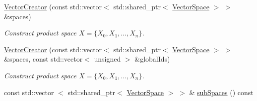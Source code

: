 \begin{DoxyCompactItemize}
\item 
\hyperlink{classSpacy_1_1ProductSpace_1_1VectorCreator_a73b6243d0ba00d019319e66bb06784dd}{\-Vector\-Creator} (const std\-::vector$<$ std\-::shared\-\_\-ptr$<$ \hyperlink{classSpacy_1_1VectorSpace}{\-Vector\-Space} $>$ $>$ \&spaces)
\begin{DoxyCompactList}\small\item\em \-Construct product space $ X = \{ X_0 , X_1 , \ldots , X_n \} $. \end{DoxyCompactList}\item 
\hyperlink{classSpacy_1_1ProductSpace_1_1VectorCreator_a63b039f3e2872a0488223121ed5eceb9}{\-Vector\-Creator} (const std\-::vector$<$ std\-::shared\-\_\-ptr$<$ \hyperlink{classSpacy_1_1VectorSpace}{\-Vector\-Space} $>$ $>$ \&spaces, const std\-::vector$<$ unsigned $>$ \&global\-Ids)
\begin{DoxyCompactList}\small\item\em \-Construct product space $ X = \{ X_0 , X_1 , \ldots , X_n \} $. \end{DoxyCompactList}\item 
\hypertarget{classSpacy_1_1ProductSpace_1_1VectorCreator_aa46303313c37f29cdfe54479d85cfe87}{const std\-::vector\*
$<$ std\-::shared\-\_\-ptr$<$ \hyperlink{classSpacy_1_1VectorSpace}{\-Vector\-Space} $>$ $>$ \& \hyperlink{classSpacy_1_1ProductSpace_1_1VectorCreator_aa46303313c37f29cdfe54479d85cfe87}{sub\-Spaces} () const }\label{classSpacy_1_1ProductSpace_1_1VectorCreator_aa46303313c37f29cdfe54479d85cfe87}


\end{DoxyCompactItemize}
